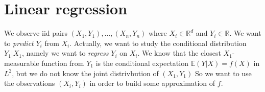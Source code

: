 \documentclass[
	fontsize=11pt, %
	twoside=false, %
	numbers=noenddot, %
]{kaobook}
\newcommand{\E}{\mathbb E}
\newcommand{\R}{\mathbb R}
\begin{document}









\mainmatter %









\setchapterpreamble[u]{\margintoc}
\chapter{Linear regression}
\label{chap:linear_regression}

We observe iid pairs $(X_1, Y_1), \ldots, (X_n, Y_n)$ where $X_i \in \R^d$ and $Y_i \in \R$.
We want to \emph{predict} $Y_i$ from $X_i$.
Actually, we want to study the conditional distribution $Y_1 | X_1$, namely we want to \emph{regress} $Y_i$ on $X_i$.
We know that the closest $X_1$-measurable function from $Y_1$ is the conditional expectation $\E (Y | X) = f(X)$  in $L^2$, but we do not know the joint distrivbution of $(X_1, Y_1)$
So we want to use the observations $(X_i, Y_i)$ in order to build some approximation of $f$.
\end{document}
